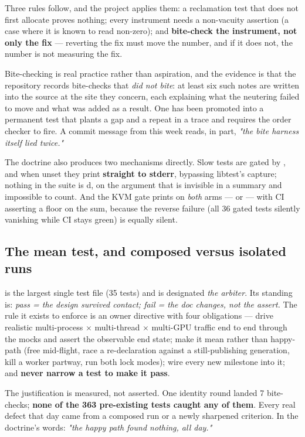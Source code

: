 \documentclass[10.5pt]{article}
\begin{document}
Three rules follow, and the project applies them: a reclamation test that does not first
allocate proves nothing; every instrument needs a non-vacuity assertion (a case where it is
known to read non-zero); and \textbf{bite-check the instrument, not only the fix} — reverting the
fix must move the number, and if it does not, the number is not measuring the fix.

Bite-checking is real practice rather than aspiration, and the evidence is that the repository
records bite-checks that \emph{did not bite}: at least six such notes are written into the
source at the site they concern, each explaining what the neutering failed to move and what was
added as a result. One has been promoted into a permanent test that plants a gap and a repeat in
a trace and requires the order checker to fire. A commit message from this week reads, in part,
\emph{"the bite harness itself lied twice."}

The doctrine also produces two mechanisms directly. Slow tests are gated by
, and when unset they print  \textbf{straight to
stderr}, bypassing libtest's capture; nothing in the suite is \code{\#[ignore]}d, on the argument
that \code{\#[ignore]} is invisible in a summary and impossible to count. And the KVM gate prints
on \emph{both} arms —  or  — with CI asserting a
floor on the sum, because the reverse failure (all 36 gated tests silently vanishing while CI
stays green) is equally silent.

\subsection{The mean test, and composed versus isolated runs}

 is the largest single test file (35 tests) and is designated
\emph{the arbiter}. Its standing is: \emph{pass = the design survived contact; fail = the doc
changes, not the assert.} The rule it exists to enforce is an owner directive with four
obligations — drive realistic multi-process $\times$ multi-thread $\times$ multi-GPU traffic end
to end through the mocks and assert the observable end state; make it mean rather than happy-path
(free mid-flight, race a re-declaration against a still-publishing generation, kill a worker
partway, run both lock modes); wire every new milestone into it; and \textbf{never narrow a test
to make it pass}.

The justification is measured, not asserted. One identity round landed 7 bite-checks; \textbf{none
of the 363 pre-existing tests caught any of them}. Every real defect that day came from a composed
run or a newly sharpened criterion. In the doctrine's words: \emph{"the happy path found nothing,
all day."}
\end{document}
